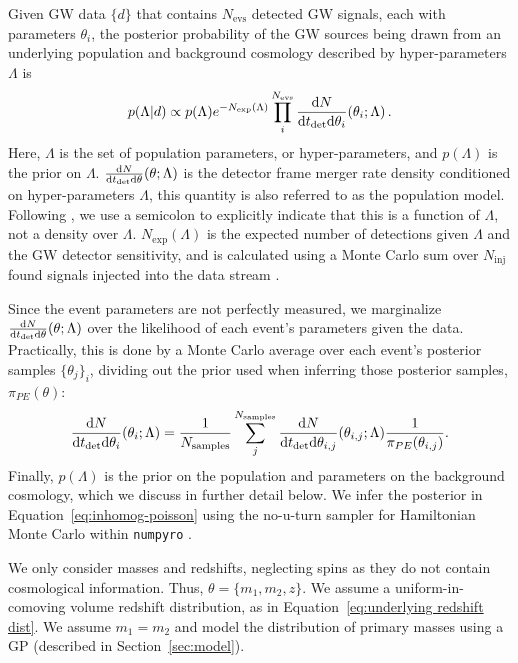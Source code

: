 \documentclass[]{aastex631}
\begin{document}
Given \ac{GW} data $\{d\}$ that contains $N_{\text{evs}}$ detected \ac{GW} signals, each with parameters $\theta_i$, the posterior probability of the \ac{GW} sources being drawn from an underlying population and background cosmology described by hyper-parameters $\Lambda$ is \citep{loredo, taylor, mandel}
\begin{equation}
    p(\Lambda|d) \propto p(\Lambda) e^{-N_{\text{exp}}(\Lambda)} \prod_i^{N_{\text{evs}}} \frac{\diff N}{\diff t_{\det} \diff \theta_i} (\theta_i;\Lambda) \, .
    \label{eq:inhomog-poisson}
\end{equation}
Here, $\Lambda$ is the set of population parameters, or hyper-parameters, and $p(\Lambda)$ is the prior on $\Lambda$.
$\frac{\text{d} N}{\text{d} t_{\det} \text{d} \theta} (\theta;\Lambda)$ is the detector frame merger rate density conditioned on hyper-parameters $\Lambda$, this quantity is also referred to as the population model.
Following \citet{callister_parameter-free_2023}, we use a semicolon to explicitly indicate that this is a function of $\Lambda$, not a density over $\Lambda$.
$N_{\text{exp}}(\Lambda)$ is the expected number of detections given $\Lambda$ and the \ac{GW} detector sensitivity, and is calculated using a Monte Carlo sum over $N_{\text{inj}}$ found signals injected into the data stream \citep[see][for a detailed explanation of this process]{essick}.

Since the event parameters are not perfectly measured, we marginalize $\frac{\text{d} N}{\text{d} t_{\det} \text{d} \theta} (\theta;\Lambda)$ over the likelihood of each event's parameters given the data.
Practically, this is done by a Monte Carlo average over each event's posterior samples $\{\theta_j\}_i$, dividing out the prior used when inferring those posterior samples, $\pi_{PE}(\theta)$:
\begin{equation}
    \frac{\diff N}{\diff t_{\det} \diff \theta_i} (\theta_i;\Lambda) = \frac{1}{N_{\text{samples}}}\sum_j^{N_{\text{samples}}} \frac{\diff N}{\diff t_{\det} \diff \theta_{i,j}} (\theta_{i,j};\Lambda) \frac{1}{\pi_{PE}(\theta_{i,j})} .
    \label{eq:single-event-likelihood}
\end{equation}
Finally, $p(\Lambda)$ is the prior on the population and parameters on the background cosmology, which we discuss in further detail below.
We infer the posterior in Equation~\ref{eq:inhomog-poisson} using the no-u-turn sampler for Hamiltonian Monte Carlo within \texttt{numpyro} \citep{hoffman_no-u-turn_2011, numpyro}. 

We only consider masses and redshifts, neglecting spins as they do not contain cosmological information.
Thus, $\theta = \{m_1,m_2,z\}$.
We assume a uniform-in-comoving volume redshift distribution, as in Equation~\ref{eq:underlying redshift dist}.
We assume $m_1=m_2$ and model the distribution of primary masses using a \acl{GP} (described in Section~\ref{sec:model}).
\end{document}
